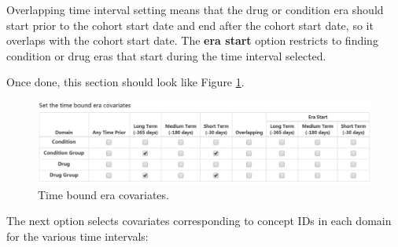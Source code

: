 \documentclass[11pt]{book}
\theoremstyle{definition}
\theoremstyle{definition}
\theoremstyle{definition}
\theoremstyle{remark}
\begin{document}
Overlapping time interval setting means that the drug or condition era should start prior to the cohort start date and end after the cohort start date, so it overlaps with the cohort start date. The \textbf{era start} option restricts to finding condition or drug eras that start during the time interval selected.

Once done, this section should look like Figure \ref{fig:covariateSettings4}.

\begin{figure}

{\centering \includegraphics[width=1\linewidth]{images/PatientLevelPrediction/covariateSettings4} 

}

\caption{Time bound era covariates.}\label{fig:covariateSettings4}
\end{figure}

The next option selects covariates corresponding to concept IDs in each domain for the various time intervals:
\end{document}
